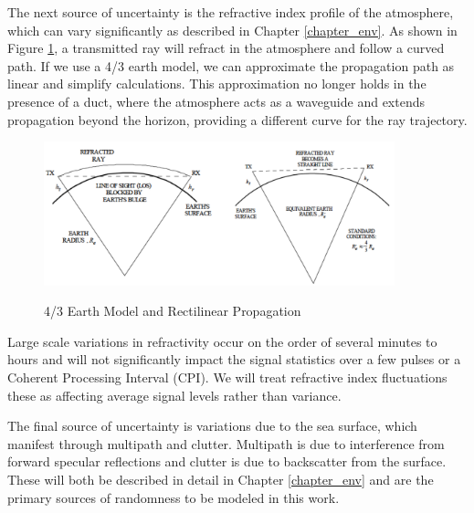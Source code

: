 The next source of uncertainty is the refractive index profile of the atmosphere, which can vary significantly as described in Chapter \ref{chapter_env}. As shown in Figure \ref{rmt_fig:2}, a transmitted ray will refract in the atmosphere and follow a curved path. If we use a 4/3 earth model, we can approximate the propagation path as linear and simplify calculations. This approximation no longer holds in the presence of a duct, where the atmosphere acts as a waveguide and extends propagation beyond the horizon, providing a different curve for the ray trajectory.
\begin{figure}[H]
  \begin{center}
\includegraphics[width=4in]{../media/multistatic/earth_refractivity.png}
  \end{center}
  \renewcommand{\baselinestretch}{1} \small\normalsize
  \begin{quote}
    \caption[4/3 Earth Model and Rectilinear Propagation]{4/3 Earth Model and Rectilinear Propagation\label{rmt_fig:2}}
  \end{quote}
\end{figure}
\renewcommand{\baselinestretch}{2} \small\normalsize
Large scale variations in refractivity occur on the order of several minutes to hours and will not significantly impact the signal statistics over a few pulses or a Coherent Processing Interval (CPI). We will treat refractive index fluctuations these as affecting average signal levels rather than variance.

The final source of uncertainty is variations due to the sea surface, which manifest through multipath and clutter. Multipath is due to interference from forward specular reflections and clutter is due to backscatter from the surface. These will both be described in detail in Chapter \ref{chapter_env} and are the primary sources of randomness to be modeled in this work. 
